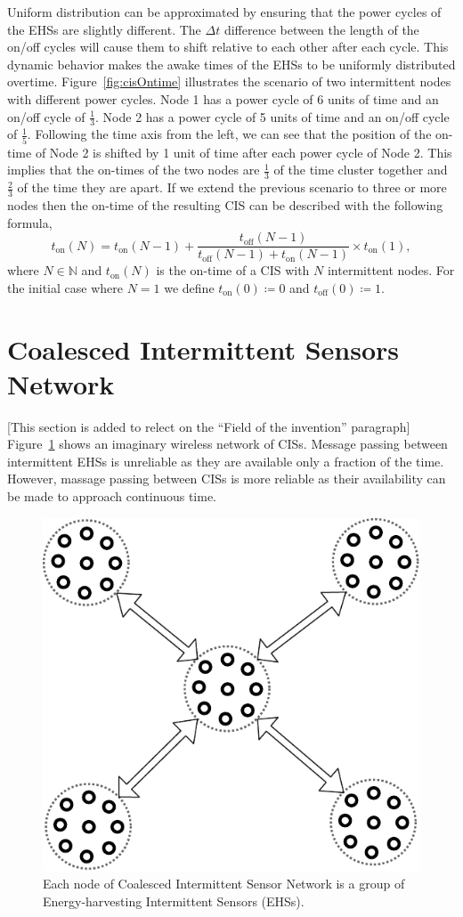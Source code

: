 \documentclass{article}
\newcommand{\fullsys}{Coalesced Intermittent Sensor\xspace}
\newcommand{\sys}{CIS\xspace}
\begin{document}
Uniform distribution can be approximated by ensuring that the power cycles of the EHSs are slightly different. 
The $\Delta{t}$ difference between the length of the on/off cycles will cause them to shift relative to each other after each cycle. This dynamic behavior makes the awake times of the EHSs to be uniformly distributed overtime.
Figure~\ref{fig:cisOntime} illustrates the scenario of two intermittent nodes with different power cycles. Node 1 has a power cycle of 6 units of time and an on/off cycle of $\frac{1}{3}$. Node 2 has a power cycle of 5 units of time and an on/off cycle of $\frac{1}{5}$. Following the time axis from the left, we can see that the position of the on-time of Node 2 is shifted by 1 unit of time after each power cycle of Node 2. This implies that the on-times of the two nodes are $\frac{1}{3}$ of the time cluster together and $\frac{2}{3}$ of the time they are apart. If we extend the previous scenario to three or more nodes then the on-time of the resulting \sys can be described with the following formula,
\begin{equation}
	t_\text{on}(N) = t_\text{on}(N-1) + \frac{t_\text{off}(N-1)}{t_\text{off}(N-1)+t_\text{on}(N-1)} \times t_\text{on}(1),
		\label{eq:cisModel}
\end{equation}
where $N \in \mathbb{N}$ and  $t_\text{on}(N)$ is the on-time of a \sys with $N$ intermittent nodes. For the initial case where $N=1$ we define $t_\text{on}(0)\coloneqq 0$ and $t_\text{off}(0) \coloneqq 1$.


\section*{Coalesced Intermittent Sensors Network}
[This section is added to relect on the ``Field of the invention'' paragraph]
Figure~\ref{fig:cis_net} shows an imaginary wireless network of \sys{}s. Message passing between intermittent EHSs is unreliable as they are available only a fraction of the time. However, massage passing between \sys{}s is more reliable as their availability can be made to approach continuous time. 

\begin{figure}[t]
		\centering
		\includegraphics[width=.5\columnwidth]{figures/cis_net}
		\caption{Each node of \fullsys Network is a group of Energy-harvesting Intermittent Sensors (EHSs).}
		\label{fig:cis_net}
\end{figure} 
\end{document}

